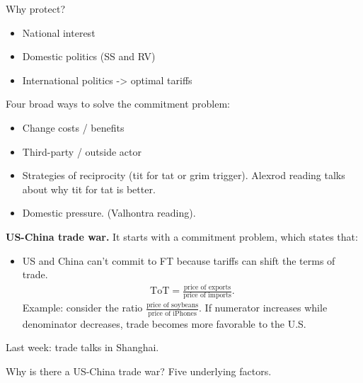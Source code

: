 \documentclass{article}
\begin{document}
Why protect?
\begin{itemize}
  \item National interest
  \item Domestic politics (SS and RV)
  \item International politics -> optimal tariffs
\end{itemize}

Four broad ways to solve the commitment problem:
\begin{itemize}
  \item Change costs / benefits
  \item Third-party / outside actor
  \item Strategies of reciprocity (tit for tat or grim trigger).  Alexrod reading talks about why tit for tat is better.
  \item Domestic pressure.  (Valhontra reading).
\end{itemize}

{\bf US-China trade war.}  It starts with a commitment problem, which states that:

\begin{itemize}
  \item US and China can't commit to FT because tariffs can shift the terms of trade.
    \begin{align*}
      \text{ToT} = \frac{\text{price of exports}}{\text{price of imports}}.
    \end{align*}
    Example: consider the ratio $\frac{\text{price of soybeans}}{\text{price of iPhones}}$.  If numerator increases while denominator decreases, trade becomes more favorable to the U.S.
\end{itemize}

Last week: trade talks in Shanghai.

Why is there a US-China trade war?  Five underlying factors.
\end{document}
